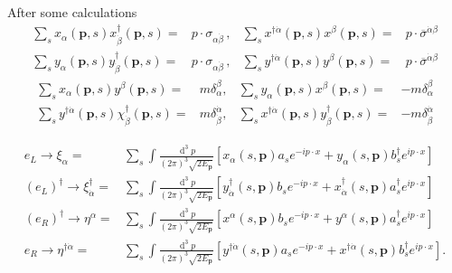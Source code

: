 After some calculations 
\begin{align}
\label{eq:xxd}
  \sum_s x_{\alpha}(\mathbf{p},s)x^{\dagger}_{\dot{\beta}}(\mathbf{p},s)=&p\cdot \sigma_{\alpha\dot{\beta}}\,, &    \sum_s x^{\dagger \dot{\alpha}}(\mathbf{p},s) x^{\beta}(\mathbf{p},s)=&p\cdot \overline{\sigma}^{\dot{\alpha}\beta}\nonumber\\
  \sum_s y_{\alpha}(\mathbf{p},s)y^{\dagger}_{\dot{\beta}}(\mathbf{p},s)=&p\cdot \sigma_{\alpha\dot{\beta}}\,, &   \sum_s y^{\dagger \dot{\alpha}}(\mathbf{p},s) y^{\beta}(\mathbf{p},s)=&p\cdot \overline{\sigma}^{\dot{\alpha}\beta} 
\end{align}
\begin{align}
\sum_{s} x_{\alpha}({\boldsymbol{p}}, s) y^{\beta}({\boldsymbol{p}}, s)=&m \delta_{\alpha}^{\beta}, & \sum_{s} y_{\alpha}({\boldsymbol{p}}, s) x^{\beta}({\boldsymbol{p}}, s)=&-m \delta_{\alpha}^{\beta} \nonumber\\
\sum_{s} y^{\dagger \dot{\alpha}}({\boldsymbol{p}}, s) \chi_{\dot{\beta}}^{\dagger}({\boldsymbol{p}}, s)=&m \delta^{\dot{\alpha}}_{\dot{\beta}}, & \sum_{s} x^{\dagger \dot{\alpha}}({\boldsymbol{p}}, s) y_{\dot{\beta}}^{\dagger}({\boldsymbol{p}}, s)=&-m \delta^{\dot{\alpha}}_{\dot{\beta}}
\end{align}


\begin{frame}
\begin{align}
\label{eq:fourweyl}
 e_L\to \xi_{\alpha}=&\sum_s\int \frac{\operatorname{d}^3p}{(2\pi)^3\sqrt{2E_{\mathbf{p}}}} \left[ x_{\alpha}\left(s,\mathbf{p}\right) a_s e^{-i p\cdot x}+y_{\alpha}\left(s,\mathbf{p}\right) b_s^{\dagger} e^{i p\cdot x}  \right]\nonumber\\
 \left( e_L \right)^{\dagger}\to \xi_{\dot{\alpha}}^{\dagger}=&\sum_s\int \frac{\operatorname{d}^3p}{(2\pi)^3\sqrt{2E_{\mathbf{p}}}} \left[ y_{\dot{\alpha}}^{\dagger}\left(s,\mathbf{p}\right) b_s e^{-i p\cdot x}+x_{\dot{\alpha}}^{\dagger}\left(s,\mathbf{p}\right) a_s^{\dagger} e^{i p\cdot x}  \right]\nonumber\\
 \left( e_R \right)^{\dagger}\to \eta^{\alpha}=&\sum_s\int \frac{\operatorname{d}^3p}{(2\pi)^3\sqrt{2E_{\mathbf{p}}}} \left[ x^{\alpha}\left(s,\mathbf{p}\right) b_s e^{-i p\cdot x}+y^{\alpha}\left(s,\mathbf{p}\right) a_s^{\dagger} e^{i p\cdot x}  \right] \nonumber\\
  e_R\to \eta^{\dagger\dot{\alpha}}=&\sum_s\int \frac{\operatorname{d}^3p}{(2\pi)^3\sqrt{2E_{\mathbf{p}}}} \left[ y^{\dagger\dot{\alpha}}\left(s,\mathbf{p}\right) a_s e^{-i p\cdot x}+x^{\dagger\dot{\alpha}}\left(s,\mathbf{p}\right) b_s^{\dagger} e^{i p\cdot x}  \right].
\end{align}
\end{frame}


